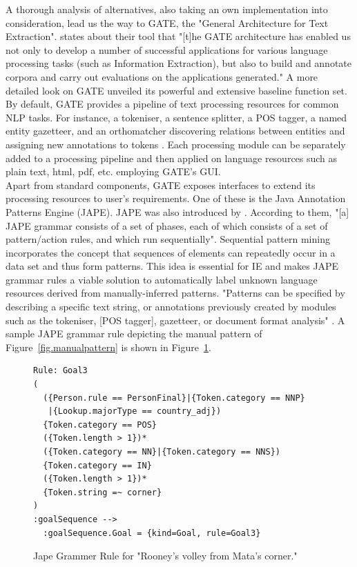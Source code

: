 \documentclass[11pt,titlepage,oneside,openany]{book}
\begin{document}
A thorough analysis of alternatives, also taking an own implementation into consideration, lead us the way to GATE, the "General Architecture for Text Extraction". \citeauthor*{Cunningham2002} \citeyearpar[p.1]{Cunningham2002} states about their tool that "[t]he GATE architecture has enabled us not only to develop a number of successful applications for various language processing tasks (such as Information Extraction), but also to build and annotate corpora and carry out evaluations on the applications generated." A more detailed look on GATE unveiled its powerful and extensive baseline function set. By default, GATE provides a pipeline of text processing resources for common NLP tasks. For instance, a tokeniser, a sentence splitter, a POS tagger, a named entity gazetteer, and an orthomatcher discovering relations between entities and assigning new annotations to tokens \citep[p.5]{Cunningham2002}. Each processing module can be separately added to a processing pipeline and then applied on language resources such as plain text, html, pdf, etc. employing GATE's GUI.\\ 

Apart from standard components, GATE exposes interfaces to extend its processing resources to user's requirements. One of these is the Java Annotation Patterns Engine (JAPE). JAPE was also introduced by \citeauthor*{Cunningham1999} \citeyearpar{Cunningham1999}. According to them, "[a] JAPE grammar consists of a set of phases, each of which consists of a set of pattern/action rules, and which run sequentially". Sequential pattern mining \citep{Agrawal1995} incorporates the concept that sequences of elements can repeatedly occur in a data set and thus form patterns. This idea is essential for IE and makes JAPE grammar rules a viable solution to automatically label unknown language resources derived from manually-inferred patterns. "Patterns can be speciﬁed by describing a speciﬁc text string, or annotations previously created by modules such as the tokeniser, [POS tagger], gazetteer, or document format analysis" \citep[p.5]{Cunningham2002}. A sample JAPE grammar rule depicting the manual pattern of Figure~\ref{fig.manualpattern} is shown in Figure~\ref{fig.jape}.\\

\begin{figure} [h!]
\centering
\begin{lstlisting}[frame=single]
Rule: Goal3
(
  ({Person.rule == PersonFinal}|{Token.category == NNP}
   |{Lookup.majorType == country_adj})
  {Token.category == POS}
  ({Token.length > 1})*
  ({Token.category == NN}|{Token.category == NNS})
  {Token.category == IN} 
  ({Token.length > 1})*
  {Token.string =~ corner}
)
:goalSequence -->
  :goalSequence.Goal = {kind=Goal, rule=Goal3}
\end{lstlisting}
\caption{Jape Grammer Rule for "Rooney's volley from Mata's corner."}
\label{fig.jape}
\end{figure}
\end{document}

